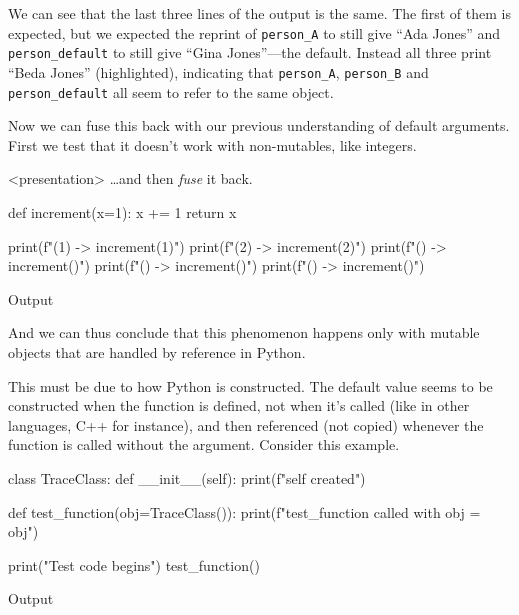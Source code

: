 \begin{description}
    We can see that the last three lines of the output is the same.
    The first of them is expected, but we expected the reprint of
    \texttt{person_A} to still give \enquote{Ada Jones} and
    \texttt{person_default} to still give
    \enquote{Gina Jones}---the default.
    Instead all three print \enquote{Beda Jones} (highlighted), indicating
    that \texttt{person_A}, \texttt{person_B} and
    \texttt{person_default} all seem to refer to the same
    object.

  \item[Fusion] Now we can fuse this back with our previous understanding of
    default arguments.
    First we test that it doesn't work with non-mutables, like integers.
    \begin{frame}<presentation>
      \dots and then \emph{fuse} it back.
    \end{frame}
    \begin{frame}[fragile]
    \begin{pyblock}[default1]
def increment(x=1):
  x += 1
  return x

print(f"(1) -> {increment(1)}")
print(f"(2) -> {increment(2)}")
print(f"()  -> {increment()}")
print(f"()  -> {increment()}")
print(f"()  -> {increment()}")
    \end{pyblock}
    \begin{block}{Output}\printpythontex[verbatim][highlightlines={3-5}]\end{block}
    \end{frame}

    And we can thus conclude that this phenomenon happens only with mutable
    objects that are handled by reference in Python.

    This must be due to how Python is constructed.
    The default value seems to be constructed when the function is defined, not
    when it's called (like in other languages, C++ for instance), and then
    referenced (not copied) whenever the function is called without the
    argument.
    Consider this example.

    \begin{frame}[fragile]
    \begin{pyblock}[default1][highlightlines=5]
class TraceClass:
  def __init__(self):
    print(f"{self} created")

def test_function(obj=TraceClass()):
  print(f"test_function called with obj = {obj}")

print("Test code begins")
test_function()
    \end{pyblock}
    \begin{block}{Output}\printpythontex[verbatim][highlightlines={1}]\end{block}
    \end{frame}


\end{description}
